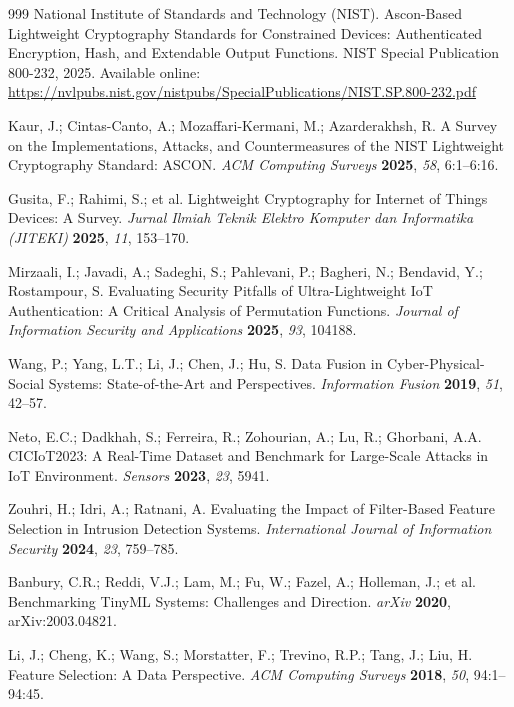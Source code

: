 \documentclass[journal,article,submit,moreauthors]{Definitions/mdpi}
\begin{document}
{\begin{thebibliography}{999}
National Institute of Standards and Technology (NIST). Ascon-Based Lightweight Cryptography Standards for Constrained Devices: Authenticated Encryption, Hash, and Extendable Output Functions.
NIST Special Publication 800-232, 2025. Available online: \url{https://nvlpubs.nist.gov/nistpubs/SpecialPublications/NIST.SP.800-232.pdf}

Kaur, J.; Cintas-Canto, A.; Mozaffari-Kermani, M.; Azarderakhsh, R. A Survey on the Implementations, Attacks, and Countermeasures of the NIST Lightweight Cryptography Standard: ASCON. \emph{ACM Computing Surveys} \textbf{2025}, \emph{58}, 6:1--6:16.

Gusita, F.; Rahimi, S.; et al. Lightweight Cryptography for Internet of Things Devices: A Survey.
\emph{Jurnal Ilmiah Teknik Elektro Komputer dan Informatika (JITEKI)} \textbf{2025}, \emph{11}, 153--170.

Mirzaali, I.; Javadi, A.; Sadeghi, S.; Pahlevani, P.; Bagheri, N.; Bendavid, Y.; Rostampour, S. Evaluating Security Pitfalls of Ultra-Lightweight IoT Authentication: A Critical Analysis of Permutation Functions. \emph{Journal of Information Security and Applications} \textbf{2025}, \emph{93}, 104188.

Wang, P.; Yang, L.T.; Li, J.; Chen, J.; Hu, S. Data Fusion in Cyber-Physical-Social Systems: State-of-the-Art and Perspectives. \emph{Information Fusion} \textbf{2019}, \emph{51}, 42--57.

Neto, E.C.; Dadkhah, S.; Ferreira, R.; Zohourian, A.; Lu, R.; Ghorbani, A.A. CICIoT2023: A Real-Time Dataset and Benchmark for Large-Scale Attacks in IoT Environment. \emph{Sensors} \textbf{2023}, \emph{23}, 5941.

Zouhri, H.; Idri, A.; Ratnani, A. Evaluating the Impact of Filter-Based Feature Selection in Intrusion Detection Systems. \emph{International Journal of Information Security} \textbf{2024}, \emph{23}, 759--785.

Banbury, C.R.; Reddi, V.J.; Lam, M.; Fu, W.; Fazel, A.; Holleman, J.; et al. Benchmarking TinyML Systems: Challenges and Direction. \emph{arXiv} \textbf{2020}, arXiv:2003.04821.

Li, J.; Cheng, K.; Wang, S.; Morstatter, F.; Trevino, R.P.; Tang, J.; Liu, H. Feature Selection: A Data Perspective. \emph{ACM Computing Surveys} \textbf{2018}, \emph{50}, 94:1--94:45.


\end{thebibliography}}
\end{document}
